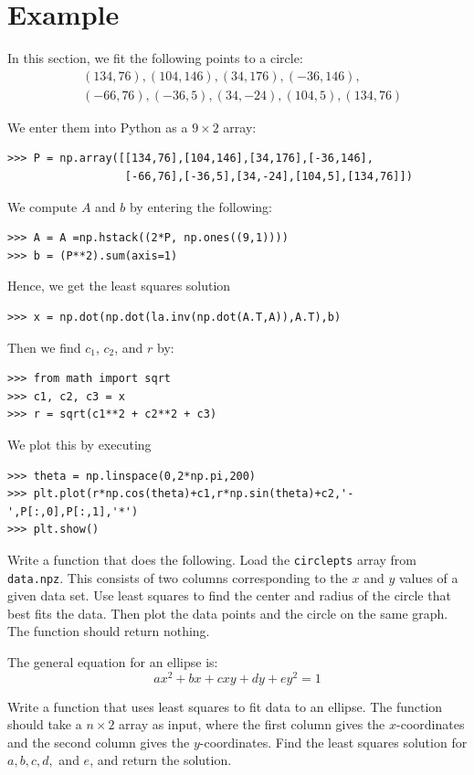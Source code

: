 \section*{Example}

In this section, we fit the following points to a circle:
\begin{align*}
&(134,76),(104,146),(34,176),(-36,146),\\
&(-66,76),(-36,5),(34,-24),(104,5),(134,76)
\end{align*}

We enter them into Python as a $9\times 2$ array:
\begin{lstlisting}
>>> P = np.array([[134,76],[104,146],[34,176],[-36,146],
                  [-66,76],[-36,5],[34,-24],[104,5],[134,76]])
\end{lstlisting}
We compute $A$ and $b$ by entering the following:
\begin{lstlisting}
>>> A = A =np.hstack((2*P, np.ones((9,1))))
>>> b = (P**2).sum(axis=1)
\end{lstlisting}
Hence, we get the least squares solution
\begin{lstlisting}
>>> x = np.dot(np.dot(la.inv(np.dot(A.T,A)),A.T),b)
\end{lstlisting}
Then we find $c_1$, $c_2$, and $r$ by:
\begin{lstlisting}
>>> from math import sqrt
>>> c1, c2, c3 = x
>>> r = sqrt(c1**2 + c2**2 + c3)
\end{lstlisting}
We plot this by executing
\begin{lstlisting}
>>> theta = np.linspace(0,2*np.pi,200)
>>> plt.plot(r*np.cos(theta)+c1,r*np.sin(theta)+c2,'-',P[:,0],P[:,1],'*')
>>> plt.show()
\end{lstlisting}


\begin{problem}
Write a function  that does the following.
Load the \texttt{circlepts} array from \texttt{data.npz}.
This consists of two columns corresponding to the $x$ and $y$ values of a given 
data set.  Use least squares to find the center and radius of the circle that best 
fits the data.  Then plot the data points and the circle on the same graph.
The function should return nothing.
\end{problem}

\begin{problem}
The general equation for an ellipse is:
\[
ax^2 + bx + cxy + dy + ey^2 = 1
\]

Write a function  that uses least squares to fit data to an ellipse. 
The function should take a $n\times 2$ array as input, where the first column gives the $x$-coordinates
and the second column gives the $y$-coordinates. Find the least squares solution for $a, b, c, d,$ and $e$,
and return the solution.
\end{problem}

